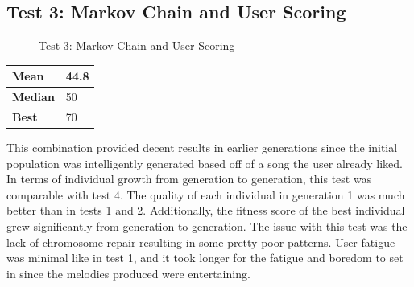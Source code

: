 \documentclass[12pt]{article} %
\begin{document}
\subsection{Test 3: Markov Chain and User Scoring}
\begin{figure}[H]
\caption{Test 3: Markov Chain and User Scoring}
\label{fig:test3}
\end{figure}
\begin{center}
	 \label{tab:stats_t3} 
    \begin{tabular}{|l|l|}
        \hline
	\bf{Mean}         & 44.8\\ \hline
	\bf{Median}         & 50 \\ \hline
	\bf{Best} & 70\\ \hline 
    \end{tabular}
\end{center}

This combination provided decent results in earlier generations since the initial population was intelligently generated based off of a song the user already liked. In terms of individual growth from generation to generation, this test was comparable with test 4. The quality of each individual in generation 1 was much better than in tests 1 and 2. Additionally, the fitness score of the best individual grew significantly from generation to generation. The issue with this test was the lack of chromosome repair resulting in some pretty poor patterns.  User fatigue was minimal like in test 1, and it took longer for the fatigue and boredom to set in since the melodies produced were entertaining.\\
\end{document}
